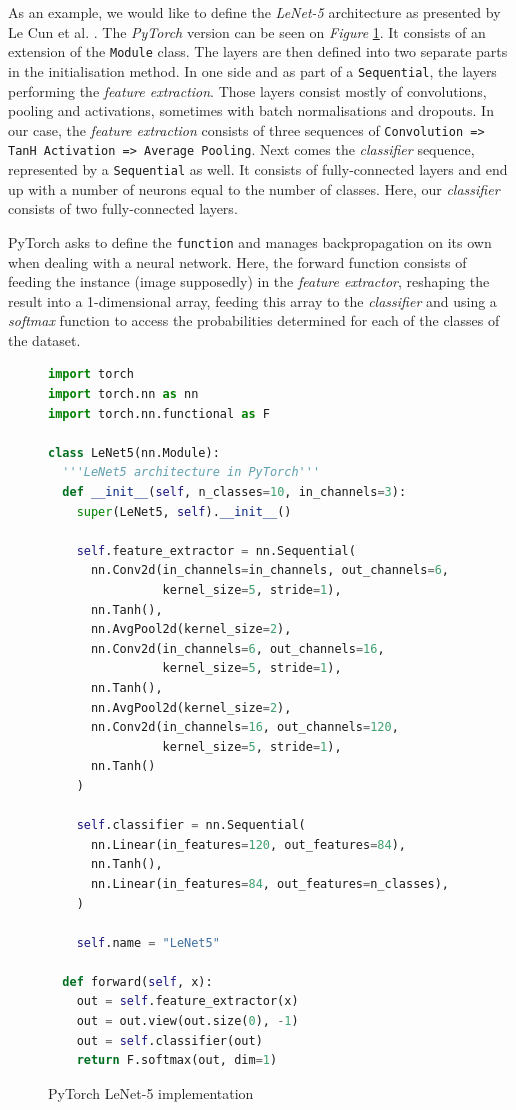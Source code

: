 As an example, we would like to define the \emph{LeNet-5} architecture as presented by Le Cun et al. \cite{LeCun1998}. The \emph{PyTorch} version can be seen on \emph{Figure} \ref{fig:LeNetPyTorch}. It consists of an extension of the \texttt{Module} class. The layers are then defined into two separate parts in the initialisation method. In one side and as part of a \texttt{Sequential}, the layers performing the \emph{feature extraction}. Those layers consist mostly of convolutions, pooling and activations, sometimes with batch normalisations and dropouts. In our case, the \emph{feature extraction} consists of three sequences of \texttt{Convolution => TanH Activation => Average Pooling}. Next comes the \emph{classifier} sequence, represented by a \texttt{Sequential} as well. It consists of fully-connected layers and end up with a number of neurons equal to the number of classes. Here, our \emph{classifier} consists of two fully-connected layers.

PyTorch asks to define the \texttt{function} and manages backpropagation on its own when dealing with a neural network. Here, the forward function consists of feeding the instance (image supposedly) in the \emph{feature extractor}, reshaping the result into a 1-dimensional array, feeding this array to the \emph{classifier} and using a \emph{softmax} function to access the probabilities determined for each of the classes of the dataset.

\begin{figure}[htbp]
\centering
\begin{lstlisting}[language=Python]
import torch
import torch.nn as nn
import torch.nn.functional as F

class LeNet5(nn.Module):
  '''LeNet5 architecture in PyTorch'''
  def __init__(self, n_classes=10, in_channels=3):
    super(LeNet5, self).__init__()

    self.feature_extractor = nn.Sequential(
      nn.Conv2d(in_channels=in_channels, out_channels=6,
                kernel_size=5, stride=1),
      nn.Tanh(),
      nn.AvgPool2d(kernel_size=2),
      nn.Conv2d(in_channels=6, out_channels=16,
                kernel_size=5, stride=1),
      nn.Tanh(),
      nn.AvgPool2d(kernel_size=2),
      nn.Conv2d(in_channels=16, out_channels=120,
                kernel_size=5, stride=1),
      nn.Tanh()
    )

    self.classifier = nn.Sequential(
      nn.Linear(in_features=120, out_features=84),
      nn.Tanh(),
      nn.Linear(in_features=84, out_features=n_classes),
    )

    self.name = "LeNet5"

  def forward(self, x):
    out = self.feature_extractor(x)
    out = out.view(out.size(0), -1)
    out = self.classifier(out)
    return F.softmax(out, dim=1)
\end{lstlisting}
\caption[LeNetPyTorch]{PyTorch LeNet-5 \cite{LeCun1998} implementation}
	\label{fig:LeNetPyTorch}
\end{figure}


